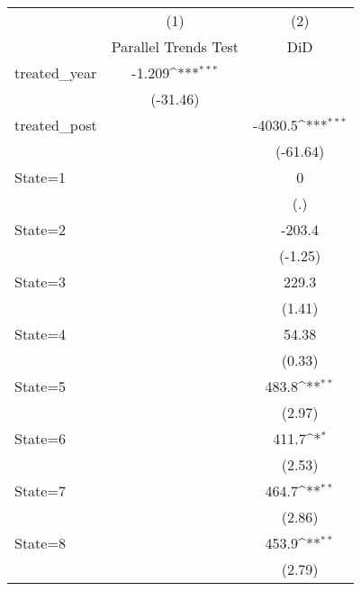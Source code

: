 {
\def\sym#1{\ifmmode^{#1}\else\(^{#1}\)\fi}
\begin{longtable}{l*{2}{c}}
\hline\hline\endfirsthead\hline\endhead\hline\endfoot\endlastfoot
                    &\multicolumn{1}{c}{(1)}&\multicolumn{1}{c}{(2)}\\
                    &\multicolumn{1}{c}{Parallel Trends Test}&\multicolumn{1}{c}{DiD}\\
\hline
treated\_year        &      -1.209\sym{***}&                     \\
                    &    (-31.46)         &                     \\
[1em]
treated\_post        &                     &     -4030.5\sym{***}\\
                    &                     &    (-61.64)         \\
[1em]
State=1             &                     &           0         \\
                    &                     &         (.)         \\
[1em]
State=2             &                     &      -203.4         \\
                    &                     &     (-1.25)         \\
[1em]
State=3             &                     &       229.3         \\
                    &                     &      (1.41)         \\
[1em]
State=4             &                     &       54.38         \\
                    &                     &      (0.33)         \\
[1em]
State=5             &                     &       483.8\sym{**} \\
                    &                     &      (2.97)         \\
[1em]
State=6             &                     &       411.7\sym{*}  \\
                    &                     &      (2.53)         \\
[1em]
State=7             &                     &       464.7\sym{**} \\
                    &                     &      (2.86)         \\
[1em]
State=8             &                     &       453.9\sym{**} \\
                    &                     &      (2.79)         \\

\end{longtable}}
